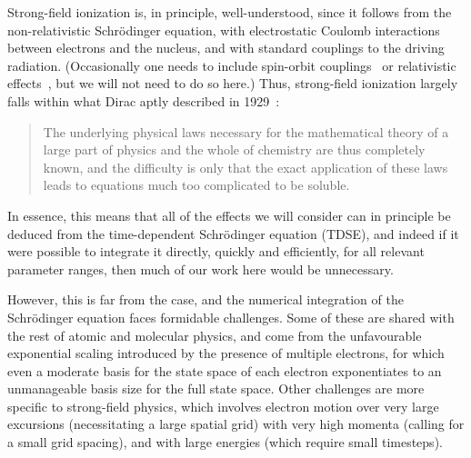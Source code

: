 Strong-field ionization is, in principle, well-understood, since it follows from the non-relativistic Schrödinger equation, with electrostatic Coulomb interactions between electrons and the nucleus, and with standard couplings to the driving radiation. (Occasionally one needs to include spin-orbit couplings~\cite{barth_spin-polarized_2013} or relativistic effects~\cite{milosevic_relativistic_2002}, but we will not need to do so here.) Thus, strong-field ionization largely falls within what Dirac aptly described in 1929~\cite{dirac_qm-many-electron_1929}:
%
\begin{quote}
The underlying physical laws necessary for the mathematical theory of a large part of physics and the whole of chemistry are thus completely known, and the difficulty is only that the exact application of these laws leads to equations much too complicated to be soluble.
\end{quote}
%
In essence, this means that all of the effects we will consider can in principle be deduced from the time-dependent Schrödinger equation (TDSE), and indeed if it were possible to integrate it directly, quickly and efficiently, for all relevant parameter ranges, then much of our work here would be unnecessary.

However, this is far from the case, and the numerical integration of the Schrödinger equation faces formidable challenges. Some of these are shared with the rest of atomic and molecular physics, and come from the unfavourable exponential scaling introduced by the presence of multiple electrons, for which even a moderate basis for the state space of each electron exponentiates to an unmanageable basis size for the full state space. Other challenges are more specific to strong-field physics, which involves electron motion over very large excursions (necessitating a large spatial grid) with very high momenta (calling for a small grid spacing), and with large energies (which require small timesteps).


